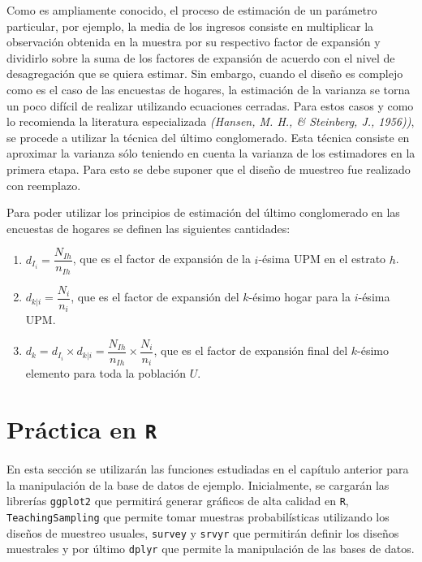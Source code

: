 \documentclass[
  spanish,
  12pt,
]{book}
\begin{document}
Como es ampliamente conocido, el proceso de estimación de un parámetro particular, por ejemplo, la media de los ingresos consiste en multiplicar la observación obtenida en la muestra por su respectivo factor de expansión y dividirlo sobre la suma de los factores de expansión de acuerdo con el nivel de desagregación que se quiera estimar. Sin embargo, cuando el diseño es complejo como es el caso de las encuestas de hogares, la estimación de la varianza se torna un poco difícil de realizar utilizando ecuaciones cerradas. Para estos casos y como lo recomienda la literatura especializada \emph{(Hansen, M. H., \& Steinberg, J., 1956))}, se procede a utilizar la técnica del último conglomerado. Esta técnica consiste en aproximar la varianza sólo teniendo en cuenta la varianza de los
estimadores en la primera etapa. Para esto se debe suponer que el diseño de muestreo fue realizado con reemplazo.

Para poder utilizar los principios de estimación del último conglomerado en las encuestas de hogares se definen las siguientes cantidades:

\begin{enumerate}
\def\labelenumi{\arabic{enumi}.}
\item
  \(d_{I_i} = \dfrac{N_{Ih}}{n_{Ih}}\), que es el factor de expansión de la \(i\)-ésima UPM en el estrato \(h\).
\item
  \(d_{k|i} = \dfrac{N_{i}}{n_{i}}\), que es el factor de expansión del \(k\)-ésimo hogar para la \(i\)-ésima UPM.
\item
  \(d_k = d_{I_i} \times d_{k|i} = \dfrac{N_{Ih}}{n_{Ih}} \times \dfrac{N_{i}}{n_{i}}\), que es el factor de expansión final del \(k\)-ésimo elemento para toda la población \(U\).
\end{enumerate}

\section{\texorpdfstring{Práctica en \texttt{R}}{Práctica en R}}\label{pruxe1ctica-en-r}

En esta sección se utilizarán las funciones estudiadas en el capítulo anterior para la manipulación de la base de datos de ejemplo. Inicialmente, se cargarán las librerías \texttt{ggplot2} que permitirá generar gráficos de alta calidad en \texttt{R}, \texttt{TeachingSampling} que permite tomar muestras probabilísticas utilizando los diseños de muestreo usuales, \texttt{survey} y \texttt{srvyr} que permitirán definir los diseños muestrales y por último \texttt{dplyr} que permite la manipulación de las bases de datos.
\end{document}
